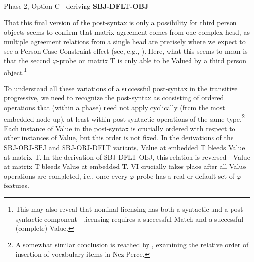 \documentclass[output=paper
,modfonts
,nonflat]{langsci/langscibook}
\begin{document}
\begin{exe}
\ex Phase 2, Option C---deriving \textbf{SBJ-DFLT-OBJ} \label{phase2-3}
\begin{xlist}
\end{xlist}
\end{exe}

\noindent That this final version of the post-syntax is only a possibility for third person objects seems to confirm that matrix agreement comes from one complex head, as multiple agreement relations from a single head are precisely where we expect to see a Person Case Constraint effect (see, e.g., \citealt{Anagnostopoulou03,BejarRezac03,AdgerHarbour07,Rezac08,Rezac11}). Here, what this seems to mean is that the second $\varphi$-probe on matrix T is only able to be Valued by a third person object.\footnote{This may also reveal that nominal licensing has both a syntactic and a post-syntactic component---licensing requires a successful Match and a successful (complete) Value.}

To understand all these variations of a successful post-syntax in the transitive progressive, we need to recognize the post-syntax as consisting of ordered operations that (within a phase) need not apply cyclically (from the most embedded node up), at least within post-syntactic operations of the same type.\footnote{A somewhat similar conclusion is reached by \citet{DealWolf17}, examining the relative order of insertion of vocabulary items in Nez Perce.} Each instance of Value in the post-syntax is crucially ordered with respect to other instances of Value, but this order is not fixed. In the derivations of the SBJ-OBJ-SBJ and SBJ-OBJ-DFLT variants, Value at embedded T bleeds Value at matrix T. In the derivation of SBJ-DFLT-OBJ, this relation is reversed---Value at matrix T bleeds Value at embedded T. VI crucially takes place after all Value operations are completed, i.e., once every $\varphi$-probe has a real or default set of $\varphi$-features.
\end{document}
